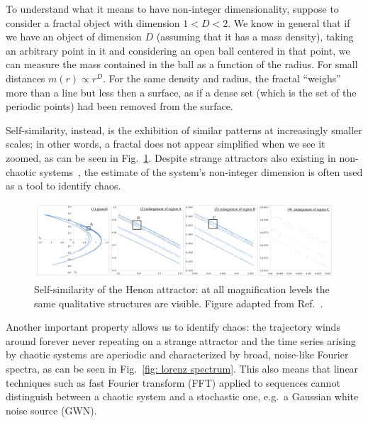 To understand what it means to have non-integer dimensionality, suppose
to consider a fractal object with dimension $1 < D < 2$.
We know in general that if we have an object of dimension $D$ (assuming that
it has a mass density), taking an arbitrary point in it and considering an open
ball centered in that point, we can measure the mass contained in the ball as
a function of the radius. For small distances $m(r)\propto r^D$. For the same density
and radius, the fractal ``weighs'' more than a line but less then a surface, as if
a dense set (which is the set of the periodic points) had been removed from the
surface.

Self-similarity, instead, is the exhibition of similar patterns at increasingly smaller
scales; in other words, a fractal does not appear simplified when we see it zoomed,
as can be seen in Fig.~\ref{fig: henon fractal}. Despite strange attractors
also existing in non-chaotic systems~\cite{ref:strange_attractors_non_chaotic}, the estimate of the system's non-integer dimension
is often used as a tool to identify chaos.

\begin{figure}[!htbp]
    \centering
    \includegraphics[width=\linewidth]{images/henon_fractal.png}
    \caption{Self-similarity of the Henon attractor: at all magnification levels the same
    qualitative structures are visible. Figure adapted from Ref.~\cite{henon2004two}.
    }\label{fig: henon fractal}
\end{figure}

Another important property allows
us to identify chaos: the trajectory winds around forever never repeating on a
strange attractor and the time series arising by chaotic systems are aperiodic
and characterized by broad, noise-like Fourier spectra, as can be seen in Fig.~\ref{fig: lorenz spectrum}.
This also means that linear techniques
such as fast Fourier transform (FFT) applied to sequences cannot distinguish between a chaotic system
and a stochastic one, e.g.\ a Gaussian white noise source (GWN).

